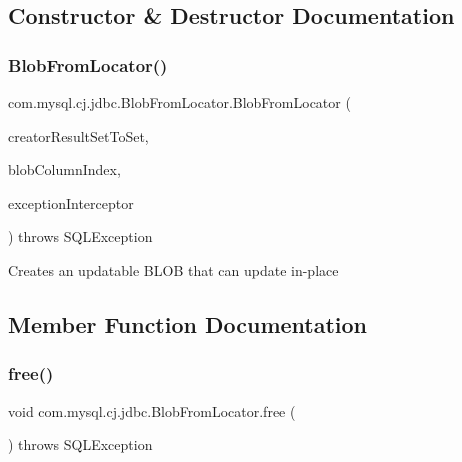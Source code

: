 \subsection{Constructor \& Destructor Documentation}
\mbox{\label{classcom_1_1mysql_1_1cj_1_1jdbc_1_1_blob_from_locator_a31ec6c3d1950b3a8a5270eac15b5a4fc}} 
\subsubsection{\texorpdfstring{Blob\+From\+Locator()}{BlobFromLocator()}}
{\footnotesize\ttfamily com.\+mysql.\+cj.\+jdbc.\+Blob\+From\+Locator.\+Blob\+From\+Locator (\begin{DoxyParamCaption}\item[{\mbox{\hyperlink{classcom_1_1mysql_1_1cj_1_1jdbc_1_1result_1_1_result_set_impl}{Result\+Set\+Impl}}}]{creator\+Result\+Set\+To\+Set,  }\item[{int}]{blob\+Column\+Index,  }\item[{\mbox{\hyperlink{interfacecom_1_1mysql_1_1cj_1_1exceptions_1_1_exception_interceptor}{Exception\+Interceptor}}}]{exception\+Interceptor }\end{DoxyParamCaption}) throws S\+Q\+L\+Exception}

Creates an updatable B\+L\+OB that can update in-\/place 

\subsection{Member Function Documentation}
\mbox{\label{classcom_1_1mysql_1_1cj_1_1jdbc_1_1_blob_from_locator_a88c2c807229112622b1d1369d6e2d682}} 
\subsubsection{\texorpdfstring{free()}{free()}}
{\footnotesize\ttfamily void com.\+mysql.\+cj.\+jdbc.\+Blob\+From\+Locator.\+free (\begin{DoxyParamCaption}{ }\end{DoxyParamCaption}) throws S\+Q\+L\+Exception}

